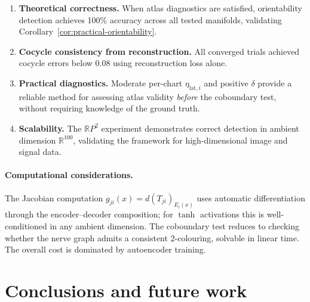 \documentclass[11pt]{article}
\newcommand{\R}{\mathbb{R}}
\theoremstyle{plain}
\theoremstyle{definition}
\theoremstyle{remark}
\begin{document}
\begin{enumerate}
    \item \textbf{Theoretical correctness.} When atlas diagnostics are satisfied, orientability detection achieves 100\% accuracy across all tested manifolds, validating Corollary~\ref{cor:practical-orientability}.
    \item \textbf{Cocycle consistency from reconstruction.} All converged trials achieved cocycle errors below 0.08 using reconstruction loss alone.
    \item \textbf{Practical diagnostics.} Moderate per-chart $\eta_{\mathrm{lat},i}$ and positive $\delta$ provide a reliable method for assessing atlas validity \emph{before} the coboundary test, without requiring knowledge of the ground truth.
    \item \textbf{Scalability.} The $\mathbb{R}P^2$ experiment demonstrates correct detection in ambient dimension $\R^{100}$, validating the framework for high-dimensional image and signal data.
\end{enumerate}


\paragraph{Computational considerations.}
The Jacobian computation $g_{ji}(x) = d(T_{ji})_{E_i(x)}$ uses automatic differentiation through the encoder--decoder composition; for $\tanh$ activations this is well-conditioned in any ambient dimension. The coboundary test reduces to checking whether the nerve graph admits a consistent 2-colouring, solvable in linear time. The overall cost is dominated by autoencoder training.

 


\section{Conclusions and future work}\label{sec:conclusions}
\end{document}
